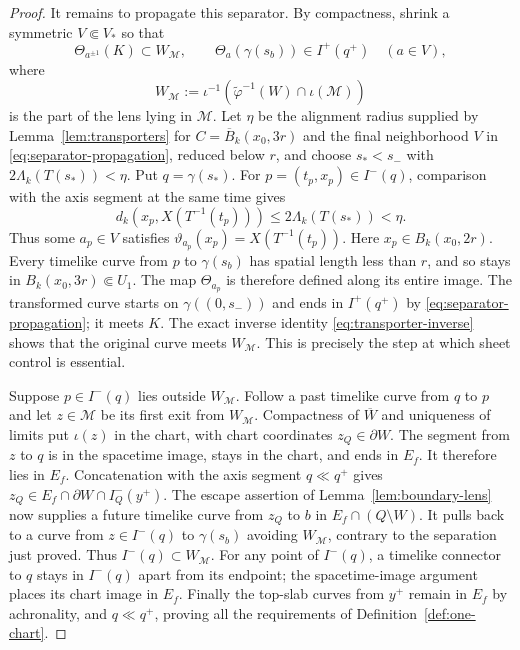 \documentclass[10pt,a4paper]{article}
\numberwithin{equation}{section}
\theoremstyle{definition}
\theoremstyle{remark}
\newcommand{\cM}{\mathcal M}
\begin{document}
\begin{proof}
It remains to propagate this separator.  By compactness, shrink a symmetric
$V\Subset V_*$ so that
\begin{equation}
 \Theta_{a^{\pm1}}(K)\subset W_{\cM},
 \qquad \Theta_a(\gamma(s_b))\in I^+(q^+)
 \quad(a\in V),
 \label{eq:separator-propagation}
\end{equation}
where
\[
 W_{\cM}:=\iota^{-1}\!\left(
 \widetilde\varphi^{-1}(W)\cap\iota(\cM)\right)
\]
is the part of the lens lying in $\cM$.  Let $\eta$ be the
alignment radius supplied by Lemma~\ref{lem:transporters} for
$C=\overline B_k(x_0,3r)$ and the final neighborhood $V$ in
\eqref{eq:separator-propagation}, reduced below $r$, and choose $s_*<s_-$ with
$2\Lambda_k(T(s_*))<\eta$.  Put $q=\gamma(s_*)$.  For
$p=(t_p,x_p)\in I^-(q)$, comparison with the axis segment at the same time
gives
\[
 d_k(x_p,X(T^{-1}(t_p)))\le2\Lambda_k(T(s_*))<\eta.
\]
Thus some $a_p\in V$ satisfies
$\vartheta_{a_p}(x_p)=X(T^{-1}(t_p))$.  Here $x_p\in B_k(x_0,2r)$.
Every timelike curve from $p$ to $\gamma(s_b)$ has spatial length less
than $r$, and so stays in $B_k(x_0,3r)\Subset U_1$.
The map $\Theta_{a_p}$ is therefore defined along its entire image.
The transformed curve starts on $\gamma((0,s_-))$ and ends in
$I^+(q^+)$ by \eqref{eq:separator-propagation}; it meets
$K$.  The exact inverse identity \eqref{eq:transporter-inverse} shows that the
original curve meets $W_{\cM}$.  This is precisely the step at which sheet
control is essential.

Suppose $p\in I^-(q)$ lies outside $W_{\cM}$.  Follow a past timelike
curve from $q$ to $p$ and let $z\in\cM$ be its first exit from
$W_{\cM}$.  Compactness of $\overline W$ and uniqueness of limits put
$\iota(z)$ in the chart, with chart coordinates $z_Q\in\partial W$.
The segment from $z$ to $q$ is in the spacetime image, stays in the chart,
and ends in $E_f$.  It therefore lies in $E_f$.  Concatenation with the
axis segment $q\ll q^+$ gives
$z_Q\in E_f\cap\partial W\cap I_Q^-(y^+)$.
The escape assertion of Lemma~\ref{lem:boundary-lens} now supplies a
future timelike curve from $z_Q$ to $b$ in $E_f\cap(Q\setminus W)$.
It pulls back to a curve from $z\in I^-(q)$ to $\gamma(s_b)$ avoiding
$W_{\cM}$, contrary to the separation just proved.
Thus $I^-(q)\subset W_{\cM}$.  For any point of $I^-(q)$, a timelike
connector to $q$ stays in $I^-(q)$ apart from its endpoint; the
spacetime-image argument places its chart image in $E_f$.
Finally the top-slab curves from $y^+$ remain in $E_f$ by achronality,
and $q\ll q^+$, proving all the requirements of
Definition~\ref{def:one-chart}.
\end{proof}
\end{document}
